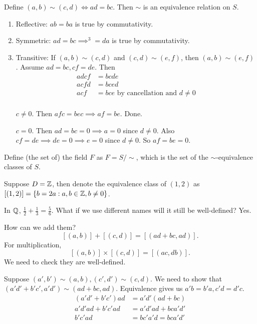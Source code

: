 \documentclass[class=article,crop=false]{standalone}
\begin{document}
\begin{lem}[]
	Define $ (a,b) \sim (c,d) \iff ad=bc$. Then $ \sim$ is an equivalence relation on  $ S$.
\end{lem}
\begin{prf}
\begin{enumerate}[label=(\roman*)]
	\item Reflective: $ ab=ba$ is true by commutativity.
	\item Symmetric: $ ad=bc \implies ^3=da$ is true by commutativity.
	\item Transitive: If $ (a,b) \sim (c,d)$ and  $ (c,d) \sim (e,f)$, then  $ (a,b) \sim (e,f)$.
		Assume  $ ad=bc, cf=de$. Then
		 \begin{align*}
			adcf &= bcde \\
			acfd &= bced \\
			acf&= bce \text{ by cancellation and } d\neq 0 \\
		\end{align*}
		\begin{case}[]
		$ c\neq 0$. Then  $ afc=bec \implies af=be$. Done.
		\end{case}
		\begin{case}[]
		$ c=0$. Then  $ ad=bc=0 \implies a=0$ since $ d\neq 0$. Also  $ cf=de \implies de=0 \implies e=0$ since $ d\neq 0$. So  $ af=be =0$.
		\end{case}
\end{enumerate}
\end{prf}
\begin{notation}
Define (the set of) the field $ F$ as  $ F= S / \sim$, which is the set of the  $ \sim$-equivalence classes of  $ S$.
\end{notation}
 \begin{eg}[]
	 Suppose $ D=\mathbb{Z}$, then denote the equivalence class of $ (1,2)$ as $ [(1,2)] = \{b=2a: a,b \in \mathbb{Z}, b\neq 0\} $.
\end{eg}
\begin{eg}[]
In $ \mathbb{Q}$, $ \frac{1}{2}+\frac{1}{3}=\frac{5}{6}$. What if we use different names will it still be well-defined? Yes.
\end{eg}

How can we add them?
\[
	[(a,b)]+[(c,d)]=[(ad+bc, ad)]
.\] 
For multiplication,
\[
	[(a,b)] \times [(c,d)] = [(ac,db)]
.\]
We need to check they are well-defined.
\begin{prf}
	Suppose $ (a',b') \sim (a,b), (c',d') \sim (c,d)$. We need to show that  $ (a'd'+b'c',a'd') \sim (ad+bc,ad)$. Equivalence gives us  $ a'b=b'a, c'd=d'c$.
	 \begin{align*}
		 (a'd'+b'c')ad&= a'd'(ad+bc) \\
		 a'd'ad+b'c'ad&= a'd'ad + bca'd' \\
		 b'c'ad &= bc'a'd = bca'd' \\
	\end{align*}
\end{prf}
\end{document}
